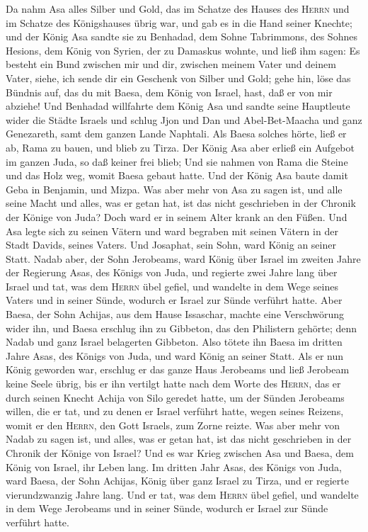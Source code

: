  Da nahm Asa alles Silber und Gold, das im Schatze des
Hauses des \textsc{Herrn} und im Schatze des Königshauses übrig war, und
gab es in die Hand seiner Knechte; und der König Asa sandte sie zu
Benhadad, dem Sohne Tabrimmons, des Sohnes Hesions, dem König von
Syrien, der zu Damaskus wohnte, und ließ ihm sagen:  Es
besteht ein Bund zwischen mir und dir, zwischen meinem Vater und deinem
Vater, siehe, ich sende dir ein Geschenk von Silber und Gold; gehe hin,
löse das Bündnis auf, das du mit Baesa, dem König von Israel, hast, daß
er von mir abziehe!  Und Benhadad willfahrte dem König
Asa und sandte seine Hauptleute wider die Städte Israels und schlug Jjon
und Dan und Abel-Bet-Maacha und ganz Genezareth, samt dem ganzen Lande
Naphtali.  Als Baesa solches hörte, ließ er ab, Rama zu
bauen, und blieb zu Tirza.  Der König Asa aber erließ ein
Aufgebot im ganzen Juda, so daß keiner frei blieb; Und sie nahmen von
Rama die Steine und das Holz weg, womit Baesa gebaut hatte. Und der
König Asa baute damit Geba in Benjamin, und Mizpa.  Was
aber mehr von Asa zu sagen ist, und alle seine Macht und alles, was er
getan hat, ist das nicht geschrieben in der Chronik der Könige von Juda?
Doch ward er in seinem Alter krank an den Füßen.  Und Asa
legte sich zu seinen Vätern und ward begraben mit seinen Vätern in der
Stadt Davids, seines Vaters. Und Josaphat, sein Sohn, ward König an
seiner Statt.  Nadab aber, der Sohn Jerobeams, ward König
über Israel im zweiten Jahre der Regierung Asas, des Königs von Juda,
und regierte zwei Jahre lang über Israel  und tat, was
dem \textsc{Herrn} übel gefiel, und wandelte in dem Wege seines Vaters
und in seiner Sünde, wodurch er Israel zur Sünde verführt hatte.
 Aber Baesa, der Sohn Achijas, aus dem Hause Issaschar,
machte eine Verschwörung wider ihn, und Baesa erschlug ihn zu Gibbeton,
das den Philistern gehörte; denn Nadab und ganz Israel belagerten
Gibbeton.  Also tötete ihn Baesa im dritten Jahre Asas,
des Königs von Juda, und ward König an seiner Statt.  Als
er nun König geworden war, erschlug er das ganze Haus Jerobeams und ließ
Jerobeam keine Seele übrig, bis er ihn vertilgt hatte nach dem Worte des
\textsc{Herrn}, das er durch seinen Knecht Achija von Silo geredet
hatte, um der Sünden Jerobeams willen,  die er tat, und
zu denen er Israel verführt hatte, wegen seines Reizens, womit er den
\textsc{Herrn}, den Gott Israels, zum Zorne reizte.  Was
aber mehr von Nadab zu sagen ist, und alles, was er getan hat, ist das
nicht geschrieben in der Chronik der Könige von Israel? 
Und es war Krieg zwischen Asa und Baesa, dem König von Israel, ihr Leben
lang.  Im dritten Jahr Asas, des Königs von Juda, ward
Baesa, der Sohn Achijas, König über ganz Israel zu Tirza, und er
regierte vierundzwanzig Jahre lang.  Und er tat, was dem
\textsc{Herrn} übel gefiel, und wandelte in dem Wege Jerobeams und in
seiner Sünde, wodurch er Israel zur Sünde verführt hatte.

